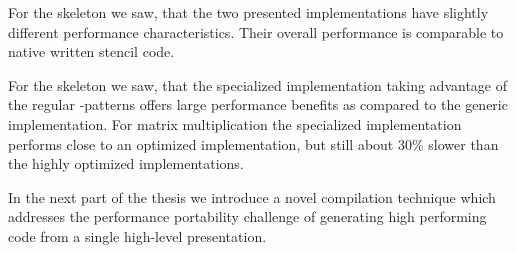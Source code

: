 For the \stencil skeleton we saw, that the two presented implementations have slightly different performance characteristics.
Their overall performance is comparable to native written stencil code.

For the \allpairs skeleton we saw, that the specialized implementation taking advantage of the regular \zip-\reduce patterns offers large performance benefits as compared to the generic implementation.
For matrix multiplication the specialized implementation performs close to an optimized \OpenCL implementation, but still about 30\% slower than the highly optimized \BLAS implementations.

\bigskip

In the next part of the thesis we introduce a novel compilation technique which addresses the performance portability challenge of generating high performing code from a single high-level presentation.

